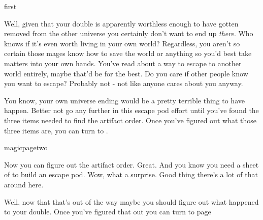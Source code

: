 \documentclass[greennotebook]{guildcamp3} %
\begin{document}
\startnotebook{\nEscapePodMagic{}}


\begin{page}{first}

Well, given that your double is apparently worthless enough to have gotten removed from the other universe you certainly don't want to end up \emph{there}. Who knows if it's even worth living in your own world? Regardless, you aren't so certain those mages know how to save the world or anything so you'd best take matters into your own hands. You've read about a way to escape to another world entirely, maybe that'd be for the best. Do you care if other people know you want to escape? Probably not - not like anyone cares about you anyway.

You know, your own universe ending would be a pretty terrible thing to have happen. Better not go any further in this escape pod effort until you've found the three items needed to find the artifact order. Once you've figured out what those three items are, you can turn to .
\end{page}



\begin{page}{magicpagetwo}

Now you can figure out the artifact order. Great. And you know you need a sheet of \iScrapMetal{} to build an escape pod. Wow, what a surprise. Good thing there's a lot of that around here. 

Well, now that that's out of the way maybe you should figure out what happened to your double. Once you've figured that out you can turn to page 

\end{page}
\end{document}
